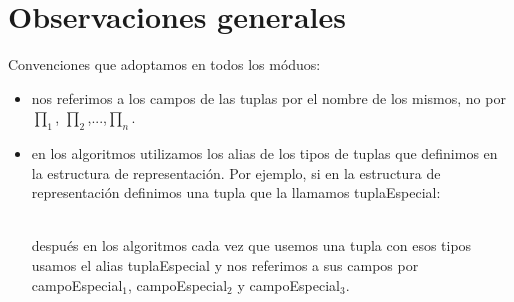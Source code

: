 \section{Observaciones generales}

Convenciones que adoptamos en todos los móduos:
\begin{itemize}
	\item nos referimos a los campos de las tuplas por el nombre de los mismos, no por $\prod_1$, $\prod_2$,...,$\prod_n$.
    \item en los algoritmos utilizamos los alias de los tipos de tuplas que definimos en la estructura de representación. Por ejemplo, si en la estructura de representación definimos una tupla que la llamamos tuplaEspecial:\\
    \begin{Tupla}[tuplaEspecial]
    \end{Tupla}\\ 
después en los algoritmos cada vez que usemos una tupla con esos tipos usamos el alias tuplaEspecial y nos referimos a sus campos por campoEspecial$_1$, campoEspecial$_2$ y campoEspecial$_3$.
\end{itemize}